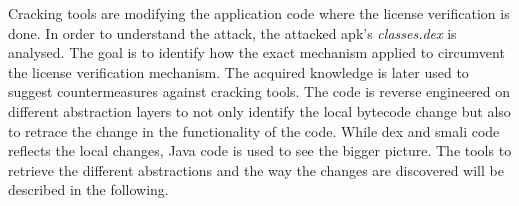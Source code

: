 Cracking tools are modifying the application code where the license verification is done.
In order to understand the attack, the attacked \gls{apk}'s \textit{classes.dex} is analysed.
The goal is to identify how the exact mechanism applied to circumvent the license verification mechanism.
The acquired knowledge is later used to suggest countermeasures against cracking tools.
\newline
The code is reverse engineered on different abstraction layers to not only identify the local bytecode change but also to retrace the change in the functionality of the code.
While dex and smali code reflects the local changes, Java code is used to see the bigger picture.
The tools to retrieve the different abstractions and the way the changes are discovered will be described in the following.
